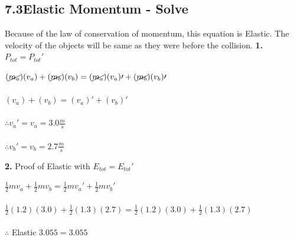 \subsection*{7.3\hspace*{0.5cm}Elastic Momentum - Solve}
Because of the law of conservation of momentum, this equation is Elastic. The velocity of the objects will be same as they were before the collision.\newline\newline
\textbf{1.} $P_{tot} = P_{tot}\prime$ \\
\begin{adjustwidth}{0.6cm}{0pt}
    $(\cancel{m_{a}})({v}_{a}) + (\cancel{m_{b}})({v}_{b}) = (\cancel{m_{a}})({v}_{a})\prime + (\cancel{m_{b}})({v}_{b})\prime$ \\\\
    $({v}_{a}) + ({v}_{b}) = ({v}_{a})\prime + ({v}_{b})\prime$ \\\\
    $\therefore v_{a}\prime = v_{a} = 3.0\frac{m}{s}$ \\\\
    $\therefore v_{b}\prime = v_{b} = 2.7\frac{m}{s}$
\end{adjustwidth}\vspace*{15pt}
\textbf{2.} Proof of Elastic with $E_{tot} = E_{tot}\prime$ \\
\begin{adjustwidth}{0.6cm}{0pt}
    $\frac{1}{2}mv_{a} + \frac{1}{2}mv_{b} = \frac{1}{2}mv_{a}\prime + \frac{1}{2}mv_{b}\prime$ \\\\
    $\frac{1}{2}(1.2)(3.0) + \frac{1}{2}(1.3)(2.7) = \frac{1}{2}(1.2)(3.0) + \frac{1}{2}(1.3)(2.7)$ \\\\
    $\therefore$ Elastic $3.055 = 3.055$
\end{adjustwidth}\vspace*{15pt}